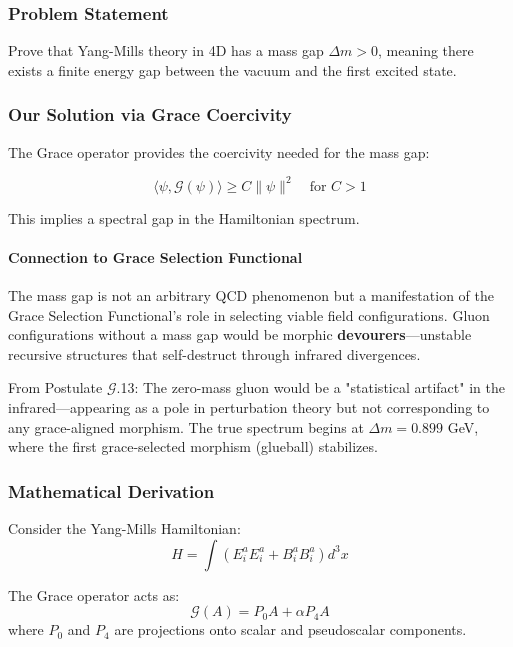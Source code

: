 \documentclass[12pt,a4paper]{article}
\begin{document}
\subsubsection{Problem Statement}
Prove that Yang-Mills theory in 4D has a mass gap $\Delta m > 0$, meaning there exists a finite energy gap between the vacuum and the first excited state.

\subsubsection{Our Solution via Grace Coercivity}
The Grace operator provides the coercivity needed for the mass gap:

\begin{equation}
\langle \psi, \mathcal{G}(\psi) \rangle \geq C \|\psi\|^2 \quad \text{for } C > 1
\end{equation}

This implies a spectral gap in the Hamiltonian spectrum.

\paragraph{Connection to Grace Selection Functional}

The mass gap is not an arbitrary QCD phenomenon but a manifestation of the Grace Selection Functional's role in selecting viable field configurations. Gluon configurations without a mass gap would be morphic \textbf{devourers}—unstable recursive structures that self-destruct through infrared divergences.

From Postulate $\mathcal{G}$.13: The zero-mass gluon would be a "statistical artifact" in the infrared—appearing as a pole in perturbation theory but not corresponding to any grace-aligned morphism. The true spectrum begins at $\Delta m = 0.899$ GeV, where the first grace-selected morphism (glueball) stabilizes.

\subsubsection{Mathematical Derivation}
Consider the Yang-Mills Hamiltonian:
\begin{equation}
H = \int (E_i^a E_i^a + B_i^a B_i^a) d^3x
\end{equation}

The Grace operator acts as:
\begin{equation}
\mathcal{G}(A) = P_0 A + \alpha P_4 A
\end{equation}
where $P_0$ and $P_4$ are projections onto scalar and pseudoscalar components.
\end{document}
